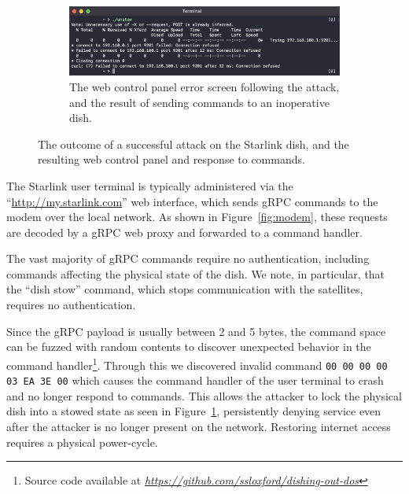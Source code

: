 \begin{figure}
\begin{subfigure}{.4335\textwidth}
        \centering\includegraphics[width=\textwidth]{img/unstow.png}
        \caption{The web control panel error screen following the attack, and the result of sending commands to an inoperative dish\footnotemark[1].}
    \end{subfigure}
\vspace{-0.7em}
\caption{The outcome of a successful attack on the Starlink dish, and the resulting web control panel and response to commands.}
\label{fig:attack-outcome}
\vspace{-1.5em}
\end{figure}

The Starlink user terminal is typically administered via the ``\url{http://my.starlink.com}'' web interface, which sends gRPC commands to the modem over the local network.
As shown in Figure~\ref{fig:modem}, these requests are decoded by a gRPC web proxy and forwarded to a command handler.

The vast majority of gRPC commands require no authentication, including commands affecting the physical state of the dish.
We note, in particular, that the ``dish stow'' command, which stops communication with the satellites, requires no authentication.

Since the gRPC payload is usually between 2 and 5 bytes, the command space can be fuzzed with random contents to discover unexpected behavior in the command handler\footnote{Source code available at \textit{\url{https://github.com/ssloxford/dishing-out-dos}}}.
Through this we discovered invalid command \lstinline{00 00 00 00 03 EA 3E 00} which causes the command handler of the user terminal to crash and no longer respond to commands.
This allows the attacker to lock the physical dish into a stowed state as seen in Figure~\ref{fig:attack-outcome}, persistently denying service even after the attacker is no longer present on the network.
Restoring internet access requires a physical power-cycle.
